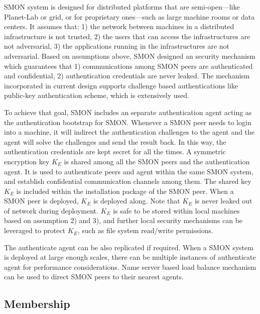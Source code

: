 SMON system is designed for distributed platforms that are
semi-open---like Planet-Lab or grid, or for proprietary
ones---such as large machine rooms or data centers. It
assumes that: 1) the network between machines in a
distributed infrastructure is not trusted, 2) the users that
can access the infrastructures are not adversarial, 3) the
applications running in the infrastructures are not
adversarial. Based on assumptions above, SMON designed an
security mechanism which guarantees that 1) communications
among SMON peers are authenticated and confidential, 2)
authentication credentials are never leaked. The mechanism
incorporated in current design supports challenge based
authentications like public-key authentication scheme, which
is extensively used.

To achieve that goal, SMON includes an separate
authentication agent acting as the authentication bootstrap
for SMON.  Whenever a SMON peer needs to login into a
machine, it will indirect the authentication challenges to
the agent and the agent will solve the challenges and send
the result back. In this way, the authentication credentials
are kept secret for all the times. A symmetric encryption
key $K_E$ is shared among all the SMON peers and the
authentication agent. It is used to authenticate peers and
agent within the same SMON system, and establish
confidential communication channels among them. The shared
key $K_E$ is included within the installation package of the
SMON peer. When a SMON peer is deployed, $K_E$ is deployed
along. Note that $K_E$ is never leaked out of network during
deployment. $K_E$ is safe to be stored within local machines
based on assumption 2) and 3), and further local security
mechanisms can be leveraged to protect $K_E$, such as file
system read/write permissions.


The authenticate agent can be also replicated if required.
When a SMON system is deployed at large enough scales, there
can be multiple instances of authenticate agent for
performance considerations. Name server based load balance
mechanism\cite{} can be used to direct SMON peers to their
nearest agents.

\subsection{Membership}

